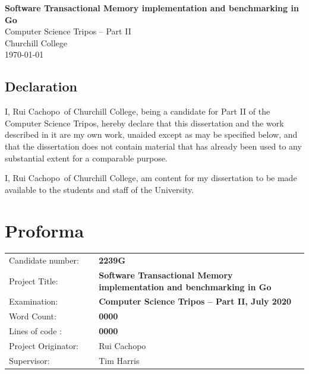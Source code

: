 \documentclass[12pt,a4paper,twoside,openright]{report}
\newcommand{\disstitle}{Software Transactional Memory implementation
  and benchmarking in Go}
\newcommand{\college}{Churchill College}
\newcommand{\studentname}{Rui Cachopo}
\newcommand{\candidatenumber}{2239G}
\newcommand{\wordcount}{0000}
\newcommand{\loc}{0000}
\newcommand{\originator}{Rui Cachopo}
\newcommand{\supervisor}{Tim Harris}
\begin{document}


\pagestyle{empty}


\rightline{\LARGE \textbf{\studentname}}

\vspace*{60mm}
\begin{center}
  \Huge
  \textbf{\disstitle} \\[5mm]
  Computer Science Tripos -- Part II \\[5mm]
  \college \\[5mm]
  \today
\end{center}

\newpage

\section*{Declaration}

I, \studentname\ of \college, being a candidate for Part II of the
Computer Science Tripos, hereby declare that this dissertation and the
work described in it are my own work, unaided except as may be
specified below, and that the dissertation does not contain material
that has already been used to any substantial extent for a comparable
purpose.

I, \studentname\ of \college, am content for my dissertation to be
made available to the students and staff of the University.

\bigskip {}

\medskip {}

\chapter*{Proforma}

\thispagestyle{empty}

{\large
  \begin{tabular}{L{0.3\linewidth} L{0.7\linewidth}}
    Candidate number: & \bf \candidatenumber                      \\
    Project Title:      & \bf \disstitle \\
    Examination:        & \bf Computer Science Tripos -- Part II, July 2020  \\
    Word Count:         & \bf \wordcount  \\
    Lines of code : & \bf \loc \\
    Project Originator: & \originator \\
    Supervisor: & \supervisor \\
  \end{tabular}
}
\end{document}
